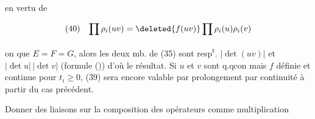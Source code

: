 en vertu de

\[
\begin{array}{ll}(40)&\displaystyle\prod\rho_i(uv)=\deleted{f(uv)}\prod\rho_i(u)\rho_i(v)\end{array}
\]

  on    que $E=F=G$, alors les deux mb. de (35) sont resp\textsuperscript{t}. $|\det(uv)|$ et $|\det u|\,|\det v|$ (formule ()) d'où le résultat. Si $u$ et $v$ sont q.qcon mais $f$ définie et continue pour $t_i\geq0$, (39) sera encore valable par prolongement par continuité à partir du cas précédent.

Donner des liaisons sur la composition des opérateurs comme multiplication

\reversemarginpar{}\normalmarginpar
